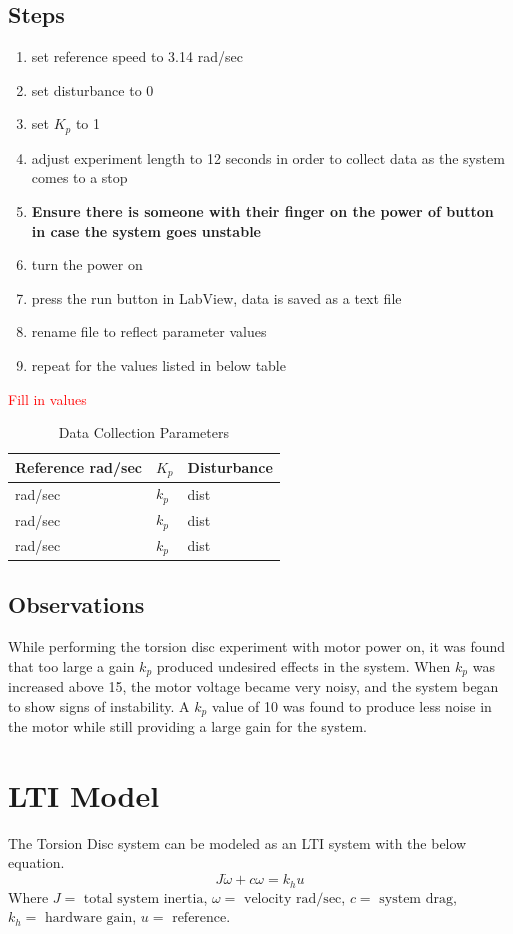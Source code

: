 \documentclass[11pt,titlepage]{article}
\begin{document}
	\subsection*{Steps}
		\begin{enumerate}
			\item set reference speed to 3.14 rad/sec
			\item set disturbance to 0
			\item set $K_p$ to 1
			\item adjust experiment length to 12 seconds in order to collect data as the system comes to a stop
			\item \textbf{Ensure there is someone with their finger on the power of button in case the system goes unstable}
			\item turn the power on
			\item press the run button in LabView, data is saved as a text file
			\item rename file to reflect parameter values
			\item repeat for the values listed in below table
		\end{enumerate}
		\textcolor{red}{Fill in values}
		\begin{table}[h!]
			\centering
			\begin{tabular}{|m{4cm}|m{3cm}|m{3cm}|} 
				\hline
				Reference rad/sec & $K_p$ & Disturbance \\ 
				\hline
				rad/sec & $k_p$ & dist\\
				\hline
				rad/sec & $k_p$ & dist\\
				\hline
				rad/sec & $k_p$ & dist \\
				\hline
			\end{tabular}
			\caption{Data Collection Parameters} \label{table:data_param}
		\end{table}
		\subsection{Observations}
		While performing the torsion disc experiment with motor power on, it was found that too large a gain $k_p$ produced undesired effects in the system. When $k_p$ was increased above 15, the motor voltage became very noisy, and the system began to show signs of instability. A $k_p$ value of 10 was found to produce less noise in the motor while still providing a large gain for the system. 

\section{LTI Model} \label{sec:LTI}
	The Torsion Disc system can be modeled as an LTI system with the below equation.
	\begin{equation} \label{eq:lti}
		J\dot{\omega}+c\omega=k_hu
	\end{equation}
	Where $J=\mbox{ total system inertia}$, $\omega=\mbox{ velocity rad/sec}$, $c=\mbox{ system drag}$, $k_h=\mbox{ hardware gain}$, $u=\mbox{ reference}$.
\end{document}
